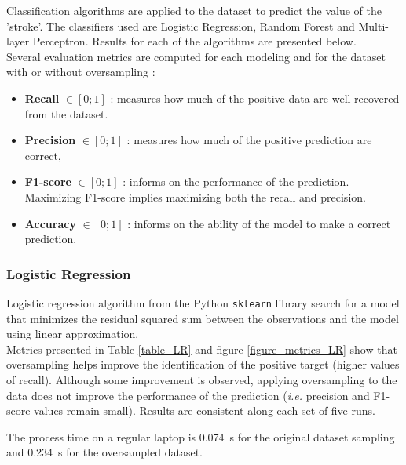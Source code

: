 Classification algorithms are applied to the dataset to predict the value of the 'stroke'. The 
classifiers used are Logistic Regression, Random Forest and Multi-layer Perceptron. 
Results for each of the algorithms are presented below.\\

Several evaluation metrics are computed for each modeling and for the dataset with or without 
oversampling :
\begin{itemize}
 \item \textbf{Recall} $\in [0;1]$ : measures how much of the positive data are well recovered from the dataset.
 \item \textbf{Precision} $\in [0;1]$ : measures how much of the positive prediction are correct, 
 \item \textbf{F1-score} $\in [0;1]$ : informs on the performance of the prediction. Maximizing F1-score implies maximizing both the recall and precision.
 \item \textbf{Accuracy} $\in [0;1]$ : informs on the ability of the model to make a correct prediction.
\end{itemize} 

\subsubsection{Logistic Regression}
Logistic regression algorithm from the Python \texttt{sklearn} library search for a model that 
minimizes the residual squared sum between the observations and the model using linear 
approximation.\\

Metrics presented in Table \ref{table_LR} and figure \ref{figure_metrics_LR} show that oversampling 
helps improve the identification of the positive target (higher values of recall). Although some 
improvement is observed, applying oversampling to the data does not improve the performance of the 
prediction (\textit{i.e.} precision and F1-score values remain small). Results are consistent along 
each set of five runs. 

The process time on a regular laptop is 0.074~s for the original dataset sampling and 0.234~s for the 
oversampled dataset.

